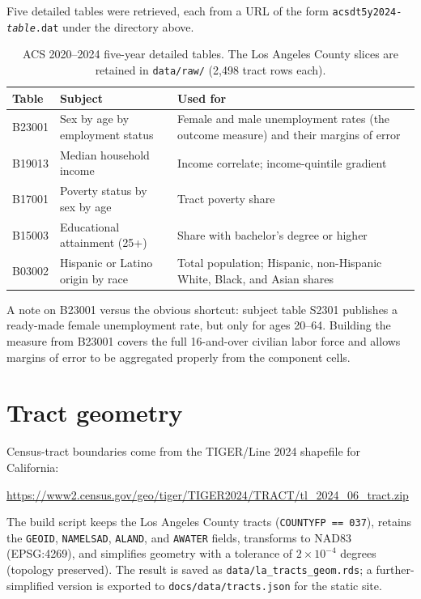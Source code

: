 \documentclass[11pt]{article}
\begin{document}
Five detailed tables were retrieved, each from a URL of the form
\texttt{acsdt5y2024-\textit{table}.dat} under the directory above.

\begin{table}[h]
\centering
\small
\begin{tabular}{@{}llp{5.6cm}@{}}
\toprule
Table & Subject & Used for \\
\midrule
B23001 & Sex by age by employment status & Female and male unemployment rates (the outcome measure) and their margins of error \\
B19013 & Median household income & Income correlate; income-quintile gradient \\
B17001 & Poverty status by sex by age & Tract poverty share \\
B15003 & Educational attainment (25+) & Share with bachelor's degree or higher \\
B03002 & Hispanic or Latino origin by race & Total population; Hispanic, non-Hispanic White, Black, and Asian shares \\
\bottomrule
\end{tabular}
\caption{ACS 2020--2024 five-year detailed tables. The Los Angeles County
slices are retained in \texttt{data/raw/} (2{,}498 tract rows each).}
\end{table}

A note on B23001 versus the obvious shortcut: subject table S2301
publishes a ready-made female unemployment rate, but only for ages 20--64.
Building the measure from B23001 covers the full 16-and-over civilian
labor force and allows margins of error to be aggregated properly from the
component cells.

\section{Tract geometry}

Census-tract boundaries come from the TIGER/Line 2024 shapefile for
California:

\begin{center}
\small\url{https://www2.census.gov/geo/tiger/TIGER2024/TRACT/tl_2024_06_tract.zip}
\end{center}

The build script keeps the Los Angeles County tracts
(\texttt{COUNTYFP == 037}), retains the \texttt{GEOID},
\texttt{NAMELSAD}, \texttt{ALAND}, and \texttt{AWATER} fields, transforms
to NAD83 (EPSG:4269), and simplifies geometry with a tolerance of
$2\times10^{-4}$ degrees (topology preserved). The result is saved as
\texttt{data/la\_tracts\_geom.rds}; a further-simplified version is
exported to \texttt{docs/data/tracts.json} for the static site.
\end{document}
